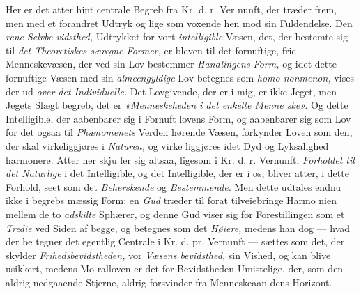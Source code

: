 Her er det atter hint centrale Begreb fra Kr. d. r. Ver\-%
nunft, der træder frem, men med et forandret Udtryk og lige\-%
som voxende hen mod sin Fuldendelse. Den \emph{rene Selvbe\-%
vidsthed,} Udtrykket for vort \emph{intelligible} Væsen, det, der
bestemte sig til \emph{det Theoretiskes særegne Former,} er
bleven til det fornuftige, frie Menneskevæsen, der ved sin Lov
bestemmer \emph{Handlingens Form,} og idet dette fornuftige
Væsen med sin \emph{almeengyldige} Lov betegnes som \emph{homo
nonmenon,} vises der ud \emph{over det Individuelle.} Det
Lovgivende, der er i mig, er ikke Jeget, men Jegets Slægt\-%
begreb, det er \emph{«Menneskeheden i det enkelte Menne\-%
ske».} Og dette Intelligible, der aabenbarer sig i Fornuft\-%
lovens Form, og aabenbarer sig som Lov for det ogsaa til
\emph{Phænomenets} Verden hørende Væsen, forkynder Loven
som den, der skal virkeliggjøres i \emph{Naturen,} og virke\-%
liggjøres idet Dyd og Lyksalighed harmonere. Atter her skju\-%
ler sig altsaa, ligesom i Kr. d. r. Vernunft, \emph{Forholdet til
det Naturlige} i det Intelligible, og det Intelligible, der er
i os, bliver atter, i dette Forhold, seet som det \emph{Beherskende}
og \emph{Bestemmende.} Men dette udtales endnu ikke i begrebs\-%
mæssig Form: en \emph{Gud} træder til forat tilveiebringe Harmo\-%
nien mellem de to \emph{adskilte} Sphærer, og denne Gud viser
sig for Forestillingen som et \emph{Tredie} ved Siden af begge, og
betegnes som det \emph{Høiere,} medens han dog --- hvad der be\-%
tegner det egentlig Centrale i Kr. d. pr. Vernunft --- sættes
som det, der skylder \emph{Frihedsbevidstheden,} vor \emph{Væsens\-%
bevidsthed,} sin Vished, og kan blive usikkert, medens Mo\-%
ralloven er det for Bevidstheden Umistelige, der, som den
aldrig nedgaaende Stjerne, aldrig forsvinder fra Menneskeaan\-%
dens Horizont.

